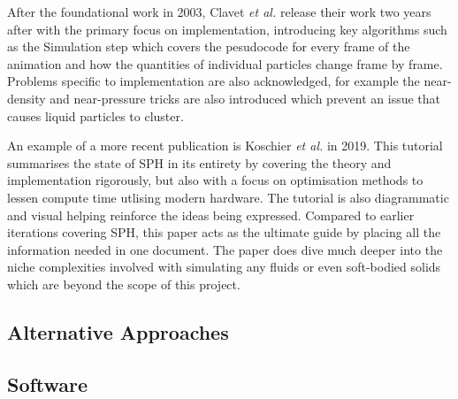 \documentclass[write-up.tex]{subfiles}
\begin{document}
After the foundational work in 2003, Clavet \textit{et al.} \cite{clavet} release their work two years after with the primary focus on implementation, introducing key algorithms such as the Simulation step which covers the pesudocode for every frame of the animation and how the quantities of individual particles change frame by frame. Problems specific to implementation are also acknowledged, for example the near-density and near-pressure tricks are also introduced which prevent an issue that causes liquid particles to cluster.%

An example of a more recent publication is Koschier \textit{et al.} \cite{koschier} in 2019. This tutorial summarises the state of SPH in its entirety by covering the theory and implementation rigorously, but also with a focus on optimisation methods to lessen compute time utlising modern hardware. The tutorial is also diagrammatic and visual helping reinforce the ideas being expressed. Compared to earlier iterations covering SPH, this paper acts as the ultimate guide by placing all the information needed in one document. The paper does dive much deeper into the niche complexities involved with simulating any fluids or even soft-bodied solids which are beyond the scope of this project.%

\subsection{Alternative Approaches}
\subsection{Software}
\end{document}

